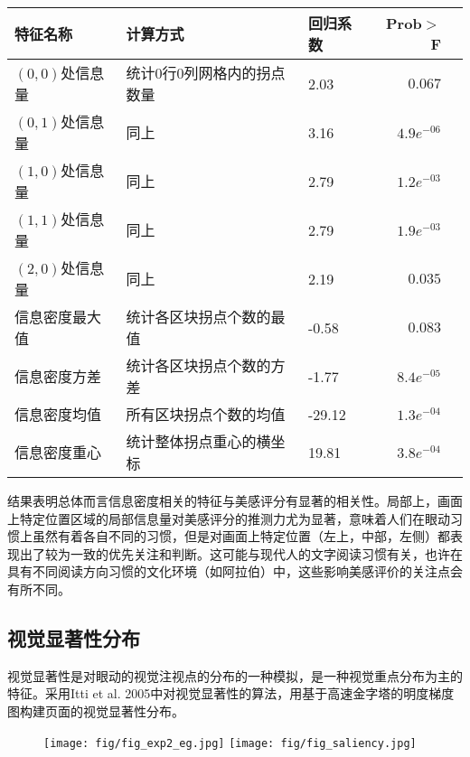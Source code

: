 \begin{table}[H]
  \centering
  \small
  \begin{tabular}{lllrr}
    \hline
     特征名称 & 计算方式 & 回归系数 & Prob$>$F \\
    \hline
    $(0, 0)$处信息量 & 统计0行0列网格内的拐点数量 & 2.03 & $0.067$\\
    $(0, 1)$处信息量 & 同上 & 3.16 & $4.9e^{-06}$\\
    $(1, 0)$处信息量 & 同上 & 2.79 & $1.2e^{-03}$\\
    $(1, 1)$处信息量 & 同上 & 2.79 & $1.9e^{-03}$\\
    $(2, 0)$处信息量 & 同上 & 2.19 & $0.035$\\
    信息密度最大值 & 统计各区块拐点个数的最值 & -0.58 & $0.083$\\
    信息密度方差 & 统计各区块拐点个数的方差 & -1.77 & $8.4e^{-05}$\\
    信息密度均值 & 所有区块拐点个数的均值 & -29.12 & $1.3e^{-04}$\\
    信息密度重心 & 统计整体拐点重心的横坐标 & 19.81 & $3.8e^{-04}$\\
    \hline
  \end{tabular}
\end{table}

结果表明总体而言信息密度相关的特征与美感评分有显著的相关性。局部上，画面上特定位置区域的局部信息量对美感评分的推测力尤为显著，意味着人们在眼动习惯上虽然有着各自不同的习惯，但是对画面上特定位置（左上，中部，左侧）都表现出了较为一致的优先关注和判断。这可能与现代人的文字阅读习惯有关，也许在具有不同阅读方向习惯的文化环境（如阿拉伯）中，这些影响美感评价的关注点会有所不同。

\subsection{视觉显著性分布}
视觉显著性是对眼动的视觉注视点的分布的一种模拟，是一种视觉重点分布为主的特征。采用Itti et al. 2005中对视觉显著性的算法，用基于高速金字塔的明度梯度图构建页面的视觉显著性分布。

\begin{figure}[H]
  \texttt{[image: fig/fig\_exp2\_eg.jpg]}
  \texttt{[image: fig/fig\_saliency.jpg]}
\end{figure}

